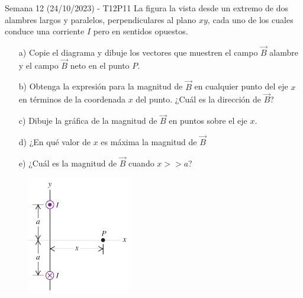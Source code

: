 \begin{frame}{Semana 12 (24/10/2023) - T12P11}
     \footnotesize
     La figura la vista desde un extremo de dos alambres largos y paralelos, perpendiculares al plano $xy$, cada uno de los cuales conduce una corriente $I$ pero en sentidos opuestos.

     \begin{itemize}
         \item[a)] Copie el diagrama y dibuje los  vectores que muestren el campo $\vec{B}$  alambre y el campo $\vec{B}$ neto en el punto $P$.
         \item[b)] Obtenga la expresión para la magnitud de $\vec{B}$ en cualquier punto del eje $x$ en términos de la coordenada $x$ del punto. ¿Cuál es la dirección de $\vec{B}$?
         \item[c)]  Dibuje la gráfica de la magnitud de $\vec{B}$ en puntos sobre el eje $x$.
         \item[d)] ¿En qué valor de $x$ es máxima la magnitud de $\vec{B}$
         \item[e)] ¿Cuál es la magnitud de $\vec{B}$ cuando $x>>a$?
     \end{itemize}
     
    \begin{figure}
        \centering
        \includegraphics[height=0.3\textwidth,width=0.4\textwidth]{figures/t14p2.png}
    \end{figure}
    
\end{frame}